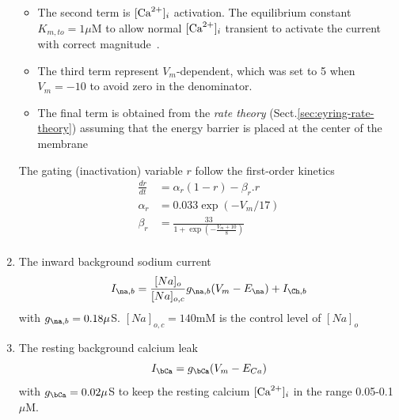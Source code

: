 \begin{enumerate}
\begin{itemize}
  \item The second term is $[{\text{Ca}^{2+}}]_i$ activation. The equilibrium
    constant $K_{m,to}=1\mu$M to allow normal $[{\text{Ca}^{2+}}]_i$ transient to activate
    the current with correct magnitude~\citep{segelbaum1980cto}.
  \item The third term represent $V_m$-dependent, which was set to 5
    when $V_m=-10$ to avoid zero in the denominator.
  \item The final term is obtained from the {\it rate theory}
  (Sect.\ref{sec:eyring-rate-theory}) assuming that the energy barrier is placed
  at the center of the membrane
  \end{itemize}
  The gating (inactivation) variable $r$ follow the first-order kinetics
\begin{equation}
  \label{eq:706}
  \begin{split}
    \frac{dr}{dt} &= \alpha_r(1-r)-\beta_r.r \\
    \alpha_r &= 0.033\exp(-V_m/17)\\
    \beta_r &= \frac{33}{1+\exp(-\frac{V_m+10}{8})} \\
  \end{split}
\end{equation}

\item The inward background sodium current 
  \begin{equation}
    \label{eq:707}
    I_{\na,b} = \frac{[Na]_o}{[Na]_{o,c}}g_{\na,b}(V_m-E_{\na})+I_{\Ch,b}
  \end{equation}
with $g_{\na,b}=0.18\mu$S. $[Na]_{o,c}=140$mM is the control level of $[Na]_o$

\item The resting background calcium leak
  \begin{equation}
    \label{eq:710}
    I_\bCa = g_\bCa (V_m-E_{Ca})
  \end{equation}
with $g_\bCa=0.02\mu$S to keep the resting calcium $[{\text{Ca}^{2+}}]_i$ in the
range 0.05-0.1$\mu$M. 

\end{enumerate}

